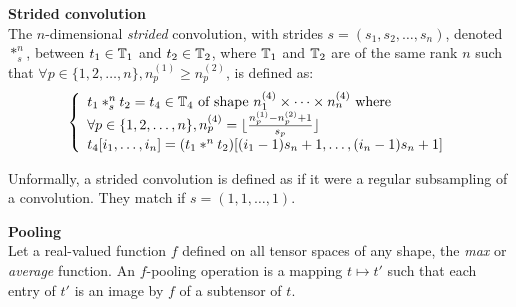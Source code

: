 \begin{definition}\textbf{Strided convolution}\\
The $n$-dimensional \emph{strided} convolution, with strides $s = (s_1, s_2, \ldots, s_n)$, denoted $\ast^n_s$, between $t_1 \in \mathbb{T}_1$ and $t_2 \in \mathbb{T}_2$, where $\mathbb{T}_1$ and $\mathbb{T}_2$ are of the same rank $n$ such that $\forall p \in \{1, 2, \ldots, n\}, n_p^{(1)} \ge n_p^{(2)}$, is defined as:
\begin{gather*}
\left\{
  \begin{array}{l}
    t_1 \ast^n_s t_2 = t_4 \in  \mathbb{T}_4 \text{ of shape } n_1^{(4)} \times \cdots \times n_n^{(4)}
    \text{ where} \\
    \forall p \in \{1, 2, \ldots, n\}, n_p^{(4)} = \lfloor\frac{n_p^{(1)} - n_p^{(2)} + 1}{s_p}\rfloor \\
    t_4[i_1, \ldots, i_n] = (t_1 \ast^n t_2)[(i_1 - 1)s_n + 1, \ldots, (i_n - 1)s_n + 1]\\
  \end{array}
\right.
\end{gather*}
\end{definition}

\begin{remark}
Unformally, a strided convolution is defined as if it were a regular subsampling of a convolution. They match if $s = (1,1,\ldots,1)$.
\end{remark}

\begin{definition}\textbf{Pooling}\\
Let a real-valued function $f$ defined on all tensor spaces of any shape, \eg the \emph{max} or \emph{average} function.
An $f$-pooling operation is a mapping $t \mapsto t'$ such that each entry of $t'$ is an image by $f$ of a subtensor of $t$.
\end{definition}